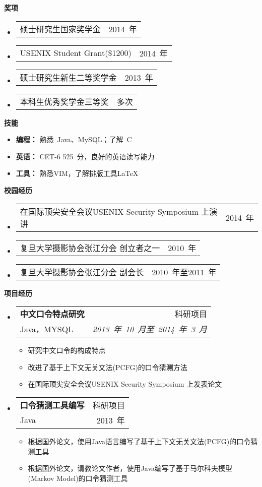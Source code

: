 \documentclass[letterpaper,10pt]{article}
\makeatletter
\newcommand{\resitem}[1]{\item #1 \vspace{-2pt}}
\newcommand{\resheading}[1]{{\large \colorbox{mygrey}{\begin{minipage}{\textwidth}{\textbf{#1 \vphantom{p\^{E}}}}\end{minipage}}}}
\newcommand{\ressubheading}[4]{
\begin{tabular*}{6.5in}{l@{\extracolsep{\fill}}r}
		\textbf{#1} & #2 \\
		#3 & #4 \\
\end{tabular*}\vspace{-6pt}}
\newcommand{\cvitem}[2]{
\begin{tabular*}{6.5in}{l@{\extracolsep{\fill}}r}
		#1 & #2 \\
\end{tabular*}\vspace{-6pt}}
\makeatother
\begin{document}
\resheading{奖项}
	\begin{itemize}
		\item \cvitem{硕士研究生国家奖学金}{2014~年}
		\item \cvitem{USENIX Student Grant(\$1200)}{2014~年}
		\item \cvitem{硕士研究生新生二等奖学金}{2013~年}
		\item \cvitem{本科生优秀奖学金三等奖}{多次}
	\end{itemize}


\resheading{{技能}}
	\begin{itemize}
		\item
            \textbf{编程：} 熟悉~Java、MySQL；了解~C
        \item
            \textbf{英语：} CET-6 525~分，良好的英语读写能力
        \item 
        	\textbf{工具：} 熟悉VIM，了解排版工具\LaTeX
	\end{itemize} %


\resheading{校园经历}
\begin{itemize}
	\item \cvitem{在国际顶尖安全会议USENIX Security Symposium 上演讲}{2014~年}
	\item \cvitem{复旦大学摄影协会张江分会 创立者之一}{2010~年}
	\item \cvitem{复旦大学摄影协会张江分会 副会长}{2010~年至2011~年}
\end{itemize}

\resheading{项目经历}
	\begin{itemize}
		\item
			\ressubheading{中文口令特点研究}{科研项目}{Java，MYSQL}{\emph{2013~年~10~月至~2014~年~3~月}}
			{\begin{itemize}
				\resitem{研究中文口令的构成特点}
                \resitem{改进了基于上下文无关文法(PCFG)的口令猜测方法}
				\resitem{在国际顶尖安全会议USENIX Security Symposium 上发表论文}
			\end{itemize}
			}	
	\end{itemize}
	\begin{itemize}
		\item 
			\ressubheading{口令猜测工具编写}{科研项目}{Java}{2013~年}
			{\begin{itemize}
				\resitem{根据国外论文，使用Java语言编写了基于上下文无关文法(PCFG)的口令猜测工具}
				\resitem{根据国外论文，请教论文作者，使用Java编写了基于马尔科夫模型(Markov Model)的口令猜测工具}
			\end{itemize}
			}
	\end{itemize}
			
\end{document}
